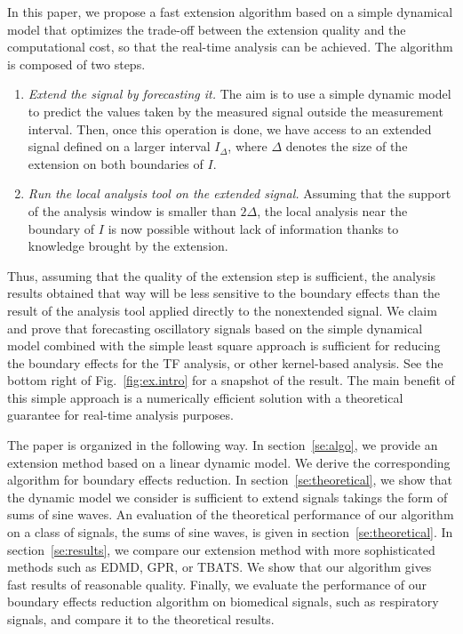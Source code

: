 \documentclass[journal]{IEEEtran}
\begin{document}
In this paper, we propose a fast extension algorithm based on a simple dynamical model that optimizes the trade-off between the extension quality and the computational cost, so that the real-time analysis can be achieved. The algorithm is composed of two steps.
\begin{enumerate}
\item \emph{Extend the signal by forecasting it.} The aim is to use a simple dynamic model to predict the values taken by the measured signal outside the measurement interval. Then, once this operation is done, we have access to an extended signal defined on a larger interval $I_\Delta$, where $\Delta$ denotes the size of the extension on both boundaries of $I$.
\item \emph{Run the local analysis tool on the extended signal.} Assuming that the support of the analysis window is smaller than $2\Delta$, the local analysis near the boundary of $I$ is now possible without lack of information thanks to knowledge brought by the extension. 
\end{enumerate}

Thus, assuming that the quality of the extension step is sufficient, the analysis results obtained that way will be less sensitive to the boundary effects than the result of the analysis tool applied directly to the nonextended signal. We claim and prove that forecasting oscillatory signals based on the simple dynamical model combined with the simple least square approach is sufficient for reducing the boundary effects for the TF analysis, or other kernel-based analysis. See the bottom right of Fig.~\ref{fig:ex.intro} for a snapshot of the result. The main benefit of this simple approach is a numerically efficient solution with a theoretical guarantee for real-time analysis purposes. 

The paper is organized in the following way. In section~\ref{se:algo}, we provide an extension method based on a linear dynamic model. We derive the corresponding algorithm for boundary effects reduction. In section~\ref{se:theoretical}, we show that the dynamic model we consider is sufficient to extend signals takings the form of sums of sine waves. An evaluation of the theoretical performance of our algorithm on a class of signals, the sums of sine waves, is given in section~\ref{se:theoretical}. In section~\ref{se:results}, we compare our extension method with more sophisticated methods such as EDMD, GPR, or TBATS. We show that our algorithm gives fast results of reasonable quality. Finally, we evaluate the performance of our boundary effects reduction algorithm on biomedical signals, such as respiratory signals, and compare it to the theoretical results. 
\end{document}
